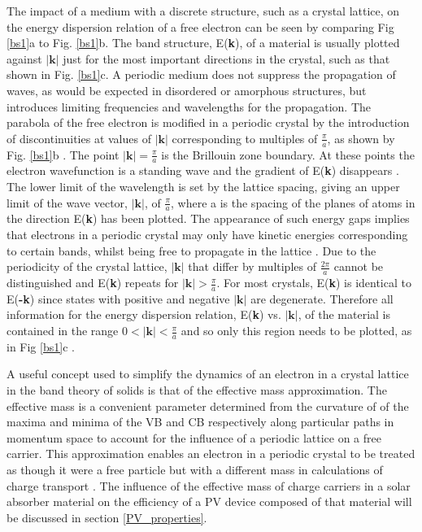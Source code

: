 \documentclass[11pt, twoside]{report}
\begin{document}
The impact of a medium with a discrete structure, such as a crystal lattice, on the energy dispersion relation of a free electron can be seen by comparing Fig \ref{bs1}a to Fig. \ref{bs1}b.
The band structure, E(\textbf{k}), of a material is usually plotted against $|\textbf{k}|$ just for the most important directions in the crystal, such as that shown in Fig. \ref{bs1}c. A periodic medium does not suppress the propagation of waves, as would be expected in disordered or amorphous structures, but introduces limiting frequencies and wavelengths for the propagation. 
The parabola of the free electron is modified in a periodic crystal by the introduction of discontinuities at values of $|\textbf{k}|$ corresponding to multiples of $\frac{\pi}{a}$, as shown by Fig. \ref{bs1}b \cite{small_semiconductor2}. The point $|\textbf{k}| = \frac{\pi}{a}$ is the Brillouin zone boundary. At these points the electron wavefunction is a standing wave and the gradient of E(\textbf{k}) disappears \cite{Nelson3}.
The lower limit of the wavelength is set by the lattice spacing, giving an upper limit of the wave vector, $|\textbf{k}|$, of $\frac{\pi}{a}$, where a is the spacing of the planes of atoms in the direction E(\textbf{k}) has been plotted.  The appearance of such energy gaps implies that electrons in a periodic crystal may only have kinetic energies corresponding to certain bands, whilst being free to propagate in the lattice \cite{small_semiconductor2}.
Due to the periodicity of the crystal lattice, $|\textbf{k}|$  that differ by multiples of $\frac{2\pi}{a}$ cannot be distinguished and E(\textbf{k}) repeats for $|\textbf{k}| > \frac{\pi}{a}$. For most crystals, E(\textbf{k}) is identical to E(\textbf{-k}) since states with positive and negative $|\textbf{k}|$ are degenerate. Therefore all information for the energy dispersion relation, E(\textbf{k}) vs. $|\textbf{k}|$, of the material is contained in the range $0 < |\textbf{k}| < \frac{\pi}{a}$ and so only this region needs to be plotted, as in Fig \ref{bs1}c \cite{Nelson3}. 

A useful concept used to simplify the dynamics of an electron in a crystal lattice in the band theory of solids is that of the effective mass approximation. The effective mass is a convenient parameter determined from the curvature of of the maxima and minima of the VB and CB respectively along particular paths in momentum space to account for the influence of a periodic lattice on a free carrier. This approximation enables an electron in a periodic crystal to be treated as though it were a free particle but with a different mass in calculations of charge transport \cite{small_semiconductor2}.
The influence of the effective mass of charge carriers in a solar absorber material on the efficiency of a PV device composed of that material will be discussed in section \ref{PV_properties}.
\end{document}
